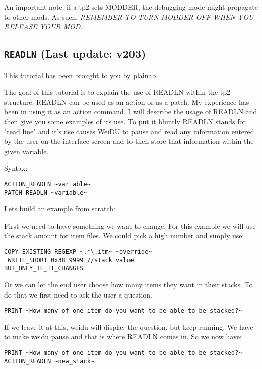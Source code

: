 \documentclass{article}
\def\DEFINE#1{{\tt \bf #1}\label{#1}\index{#1}}
\begin{document}
An important note: if a tp2 sets MODDER, the debugging mode might propagate to
other mods. As such, \emph{REMEMBER TO TURN MODDER OFF WHEN YOU RELEASE YOUR MOD.}

\subsection{\DEFINE{READLN} (Last update: v203)}

This tutorial has been brought to you by plainab.

The goal of this tutorial is to explain the use of READLN within the tp2 structure.
READLN can be used as an action or as a patch.  My experience has been in using it
as an action command. I will describe the usage of READLN and then give you some
examples of its use.  To put it bluntly READLN stands for "read line" and it's use
causes WeiDU to pause and read any information entered by the user on the interface
screen and to then store that information within the given variable.

Syntax:
\begin{verbatim}
ACTION_READLN ~variable~
PATCH_READLN ~variable~
\end{verbatim}

Lets build an example from scratch:

First we need to have something we want to change.  For this example we will use the
stack amount for item files.  We could pick a high number and simply use:

\begin{verbatim}
COPY_EXISTING_REGEXP ~.*\.itm~ ~override~
 WRITE_SHORT 0x38 9999 //stack value
BUT_ONLY_IF_IT_CHANGES
\end{verbatim}

Or we can let the end user choose how many items they want in their stacks.
To do that we first need to ask the user a question.

\begin{verbatim}
PRINT ~How many of one item do you want to be able to be stacked?~
\end{verbatim}

If we leave it at this, weidu will display the question, but keep running.
We have to make weidu pause and that is where READLN comes in. So we now have:

\begin{verbatim}
PRINT ~How many of one item do you want to be able to be stacked?~
ACTION_READLN ~new_stack~
\end{verbatim}
\end{document}
